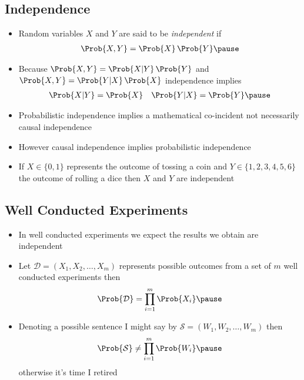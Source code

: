 \begin{slide}
\section[-2]{Independence}

\begin{PauseHighLight}
  \begin{itemize}\squeeze
  \item Random variables $X$ and $Y$ are said to be \emph{independent} if
    \begin{align*}
      \Prob{X, Y} = \Prob{X}\,\Prob{Y}\pause
    \end{align*}
  \item Because $\Prob{X,Y}= \Prob{X|Y}\,\Prob{Y}$ and $\Prob{X,Y}=
    \Prob{Y|X}\,\Prob{X}$ independence implies
    \begin{align*}
      \Prob{X|Y} &= \Prob{X} & \Prob{Y|X} = \Prob{Y}\pause
    \end{align*}
  \item Probabilistic independence implies a mathematical co-incident not
    necessarily causal independence\pause
  \item However causal independence implies probabilistic
    independence\pause
  \item If $X\in\{0,1\}$ represents the outcome of tossing a coin and
    $Y\in\{1,2,3,4,5,6\}$ the outcome of rolling a dice then $X$ and $Y$
    are independent\pause
  \end{itemize}
\end{PauseHighLight}
\end{slide}


\begin{slide}
\section[-2]{Well Conducted Experiments}

\begin{PauseHighLight}
  \begin{itemize}\squeeze
  \item In well conducted experiments we expect the results we obtain
    are independent\pause
  \item Let $\mathcal{D} = (X_1, X_2, \ldots, X_m)$ represents
    possible outcomes from a set of $m$ well conducted
    experiments then
    \begin{align*}
      \Prob{\mathcal{D}} = \prod_{i=1}^m \Prob{X_i}\pause
    \end{align*}
   \item Denoting a possible sentence I might say by
     $\mathcal{S}=(W_1, W_2,\ldots,W_m)$ then
     \begin{align*}
       \Prob{\mathcal{S}} \neq  \prod_{i=1}^m \Prob{W_i}\pause
     \end{align*}
     otherwise it's time I retired\pauseb
  \end{itemize}
\end{PauseHighLight}

\end{slide}

